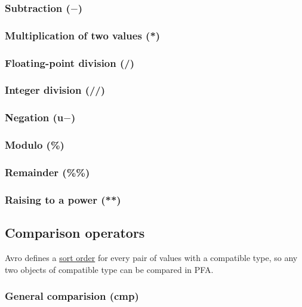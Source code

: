 \documentclass{article}
\theoremstyle{definition}
\begin{document}
\subsubsection{Subtraction ($-$)}

\subsubsection{Multiplication of two values (*)}

\subsubsection{Floating-point division (/)}

\subsubsection{Integer division (//)}

\subsubsection{Negation (u$-$)}

\subsubsection{Modulo (\%)}

\subsubsection{Remainder (\%\%)}

\subsubsection{Raising to a power (**)}

\subsection{Comparison operators}

Avro defines a \href{http://avro.apache.org/docs/1.7.6/spec.html#order}{sort order} for every pair of values with a compatible type, so any two objects of compatible type can be compared in PFA.

\subsubsection{General comparision (cmp)}
\end{document}
